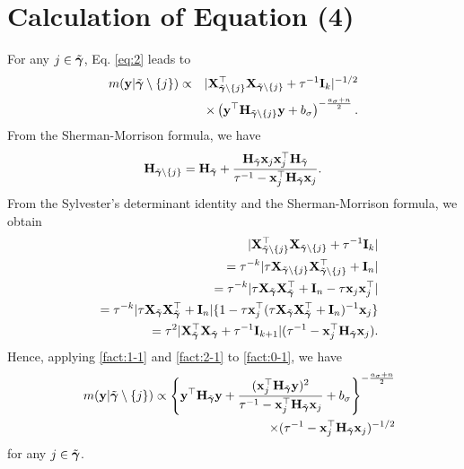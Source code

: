 \section{Calculation of Equation (4)}\label{app:2}
For any $j \in \tilde{{\boldsymbol \gamma}}$, Eq. \eqref{eq:2} leads to
\begin{eqnarray}
\nonumber m({\bf y}|\tilde{{\boldsymbol \gamma}}\setminus\{j\})&\propto& |{\bf X}_{\tilde{{\boldsymbol \gamma}}\setminus\{j\} }^{{ \top}}{\bf X}_{\tilde{{\boldsymbol \gamma}}\setminus\{j\}}+\tau^{-1}{\bf I}_{k} |^{-1/2} \\
 \label{fact:0-1}&&\times  \left({\bf y}^{{ \top}}{\bf H}_{\tilde{{\boldsymbol \gamma}}\setminus\{j\}}{\bf y}+b_{\sigma}\right)^{-\frac{a_{\sigma}+n}{2} }.
\end{eqnarray}
From the Sherman-Morrison formula, we have
\begin{eqnarray}\label{fact:1-1}
{\bf H}_{\tilde{{\boldsymbol \gamma}}\setminus\{j\} }= {\bf H}_{\tilde{{\boldsymbol \gamma}}}+\frac{{\bf H}_{\tilde{{\boldsymbol \gamma}}}{\bf x}_j {\bf x}_j
	^{{ \top}}{\bf H}_{\tilde{{\boldsymbol \gamma}}} } {\tau^{-1}-{\bf x}_j^{{ \top}}{\bf H}_{\tilde{{\boldsymbol \gamma}}}{\bf x}_j}.
\end{eqnarray}
From the Sylvester's determinant identity and the Sherman-Morrison formula, we obtain 
\begin{eqnarray}
	\nonumber &&|{\bf X}_{\tilde{{\boldsymbol \gamma}}\setminus\{j\}}^{{ \top}}{\bf X}_{\tilde{{\boldsymbol \gamma}}\setminus\{j\} }+\tau^{-1}{\bf I}_{k}   | \\
	&&= \tau^{-k}|\tau {\bf X}_{\tilde{{\boldsymbol \gamma}}\setminus\{j\} }{\bf X}_{\tilde{{\boldsymbol \gamma}}\setminus\{j\} }^{{ \top}}+{\bf I}_n |\nonumber\\
	&&= \tau^{-k}|\tau {\bf X}_{\tilde{{\boldsymbol \gamma}}}{\bf X}_{\tilde{{\boldsymbol \gamma}}}^{{ \top}}+{\bf I}_n-\tau {\bf x}_j {\bf x}_j^{{ \top}} |\nonumber\\
	&&=  \tau^{-k} |\tau {\bf X}_{\tilde{{\boldsymbol \gamma}}}{\bf X}_{\tilde{{\boldsymbol \gamma}}}^{{ \top}}+{\bf I}_n| \{1- \tau {\bf x}_j^{{ \top}}
	(\tau {\bf X}_{\tilde{{\boldsymbol \gamma}}}{\bf X}_{\tilde{{\boldsymbol \gamma}}}^{{ \top}}+{\bf I}_n)^{-1}{\bf x}_j\}\nonumber\\
	\label{fact:2-1} &&=\tau^2 | {\bf X}_{\tilde{{\boldsymbol \gamma}}}^{{ \top}}{\bf X}_{\tilde{{\boldsymbol \gamma}}}+\tau^{-1}{\bf I}_{k+1}| (\tau^{-1}-{\bf x}_j^{{ \top}}{\bf H}_{\tilde{{\boldsymbol \gamma}}} {\bf x}_j).
\end{eqnarray}
Hence, applying \eqref{fact:1-1} and \eqref{fact:2-1} to \eqref{fact:0-1}, we have
\begin{eqnarray*}
&&m({\bf y}|\tilde{{\boldsymbol \gamma}}\setminus \{j\})  \propto \left\{{\bf y}^{{ \top}}{\bf H}_{\tilde{{\boldsymbol \gamma}}}{\bf y}+\frac{(
 	{\bf x}_j^{{ \top}}{\bf H}_{\tilde{{\boldsymbol \gamma}}}{\bf y})^2}{\tau^{-1}-{\bf x}_j^{{ \top}}{\bf H}_{\tilde{{\boldsymbol \gamma}}} {\bf x}_j }+b_{\sigma}\right\}^
 {-\frac{a_{\sigma}+n}{2}}\\
 &&\times (\tau^{-1}-{\bf x}_j^{{ \top}}{\bf H}_{\tilde{{\boldsymbol \gamma}}} {\bf x}_j)^{-1/2}
\end{eqnarray*}
for any $j \in \tilde{{\boldsymbol \gamma}}$.


 





